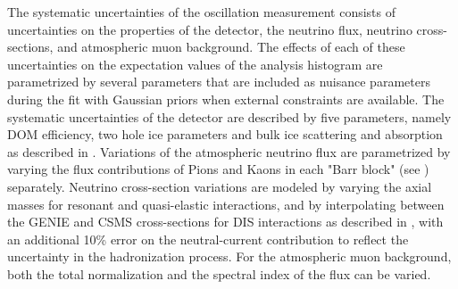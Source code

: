 The systematic uncertainties of the oscillation measurement consists of uncertainties on the properties of the detector, the neutrino flux, neutrino cross-sections, and atmospheric muon background.
The effects of each of these uncertainties on the expectation values of the analysis histogram are parametrized by several parameters that are included as nuisance parameters during the fit with Gaussian priors when external constraints are available.
The systematic uncertainties of the detector are described by five parameters, namely DOM efficiency, two hole ice parameters and bulk ice scattering and absorption as described in .
Variations of the atmospheric neutrino flux are parametrized by varying the flux contributions of Pions and Kaons in each "Barr block" (see ) separately.
Neutrino cross-section variations are modeled by varying the axial masses for resonant and quasi-elastic interactions, and by interpolating between the \textsc{GENIE} and \textsc{CSMS} cross-sections for DIS interactions as described in , with an additional 10\% error on the neutral-current contribution to reflect the uncertainty in the hadronization process.
For the atmospheric muon background, both the total normalization and the spectral index of the flux can be varied.

